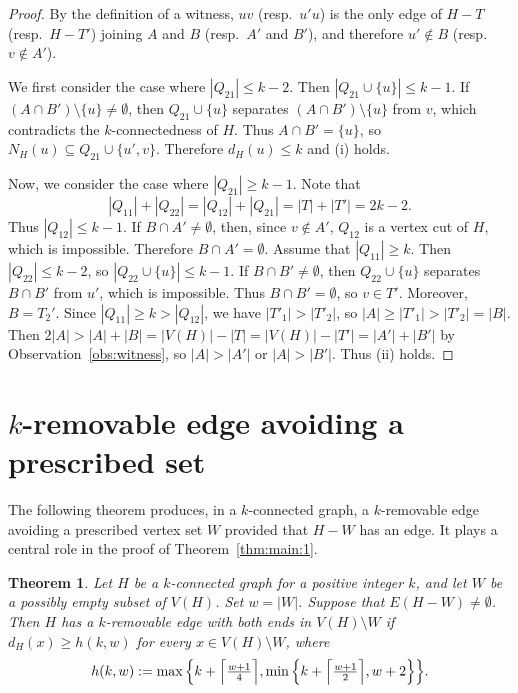 \documentclass[11pt]{article}
\numberwithin{equation}{section}
\newtheorem{theorem}{Theorem}[section]
\begin{document}
\begin{proof}
By the definition of a witness, $uv$ (resp.\ $u'u$) is the only edge of $H-T$
(resp.\ $H-T'$) joining $A$ and $B$ (resp.\ $A'$ and $B'$), and therefore $u' \not\in B$ (resp.\  $v \not\in A'$).

We first consider the case where $|Q_{21}|\le k-2$.
Then $|Q_{21}\cup\{u\}| \le k-1$.
If $(A\cap B')\setminus\{u\}\ne\emptyset$, then $Q_{21}\cup\{u\}$ separates
$(A\cap B')\setminus\{u\}$ from $v$, which contradicts the $k$-connectedness of $H$.
Thus $A\cap B'=\{u\}$, so $N_H(u) \subseteq Q_{21}\cup\{u',v\}$.
Therefore $d_H(u)\le k$ and (i) holds.

Now, we consider the case where $|Q_{21}|\ge k-1$.
Note that
\[ |Q_{11}|+|Q_{22}|=|Q_{12}|+|Q_{21}|=|T|+|T'| = 2k-2.\]
Thus $|Q_{12}|\le k-1$.
If $B\cap A'\ne\emptyset$, then, since $v \not\in A'$, $Q_{12}$ is a vertex cut of $H$, which is impossible.
Therefore $B\cap A'=\emptyset$.
Assume that $|Q_{11}|\ge k$.
Then $|Q_{22}|\le k-2$, so $|Q_{22}\cup\{u\}|\le k-1$.
If $B\cap B'\ne\emptyset$, then $Q_{22}\cup\{u\}$ separates $B\cap B'$ from $u'$, which is impossible.
Thus $B\cap B'=\emptyset$, so $v\in T'$. 
Moreover, $B=T_2'$. 
Since $|Q_{11}|\ge k>|Q_{12}|$, we have $|T'_1|>|T'_2|$, so $|A|\ge |T'_1|>|T'_2| = |B|$.
Then $2|A|>|A|+|B|=|V(H)|-|T|=|V(H)|-|T'|=|A'|+|B'|$ by Observation~\ref{obs:witness},  so $|A|>|A'|$ or $|A|>|B'|$.
Thus (ii) holds. 
\end{proof}

\section{$k$-removable edge avoiding a prescribed set}\label{sec:key:lemma}

The following theorem produces, in a $k$-connected graph, a $k$-removable edge avoiding a prescribed vertex set $W$ provided that $H-W$ has an edge. It plays a central role in the proof of Theorem~\ref{thm:main:1}.


\begin{theorem}\label{lem:key}
Let $H$ be a $k$-connected graph for a positive integer $k$, and let $W$ be a possibly empty subset of $V(H)$. Set $w=|W|$.
Suppose that $E(H-W)\neq\emptyset$.
Then $H$ has a $k$-removable edge with both ends in $V(H)\setminus W$ if $d_H(x)\ge h(k,w)$ for every $x\in V(H)\setminus W$, where
\[
    h(k,w):= \max \Big\{ k+\Bigl\lceil\tfrac{w+1}{4}\Bigr\rceil,           \min \Big\{ k+\Bigl\lceil\tfrac{w+1}{2}\Bigr\rceil,w+2            \Big\} \Big\} .
\]
\end{theorem}
\end{document}
